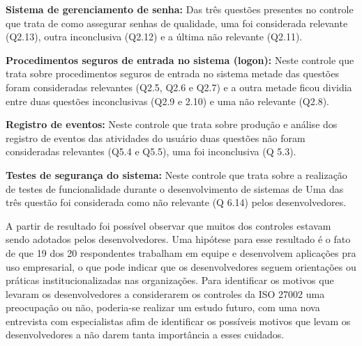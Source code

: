 \vspace{0.5cm}
\noindent\textbf{Sistema de gerenciamento de senha:}
Das três questões presentes no controle que trata de como assegurar senhas de qualidade, uma foi considerada relevante (Q2.13), outra inconclusiva (Q2.12) e a última não relevante (Q2.11).


\vspace{0.5cm}
\noindent\textbf{Procedimentos seguros de entrada no sistema (logon):}
Neste controle que trata sobre procedimentos seguros de entrada no sistema metade das questões foram consideradas relevantes (Q2.5, Q2.6 e Q2.7) e a outra metade ficou dividia entre duas questões inconclusivas (Q2.9 e 2.10) e uma não relevante (Q2.8).

\vspace{0.5cm}
\noindent\textbf{Registro de eventos:}
Neste controle que trata sobre produção e análise dos registro de eventos das atividades do usuário duas questões não foram consideradas relevantes (Q5.4 e Q5.5), uma foi inconclusiva (Q 5.3).

\vspace{3cm}
\noindent\textbf{Testes de segurança do sistema:}
 Neste controle que trata sobre a realização de testes de funcionalidade durante o desenvolvimento de sistemas de Uma das três questão foi considerada como não relevante (Q 6.14) pelos desenvolvedores.


A partir de resultado foi possível observar que muitos dos controles estavam sendo adotados pelos desenvolvedores. Uma hipótese para esse resultado é o fato de que 19 dos 20 respondentes trabalham em equipe e desenvolvem aplicações pra uso empresarial, o que pode indicar que os desenvolvedores seguem orientações ou práticas institucionalizadas nas organizações. Para identificar os motivos que levaram os desenvolvedores a considerarem os controles da ISO 27002 uma preocupação ou não, poderia-se realizar um estudo futuro, com uma nova entrevista com especialistas afim de identificar os possíveis motivos que levam os desenvolvedores a não darem tanta importância a esses cuidados.